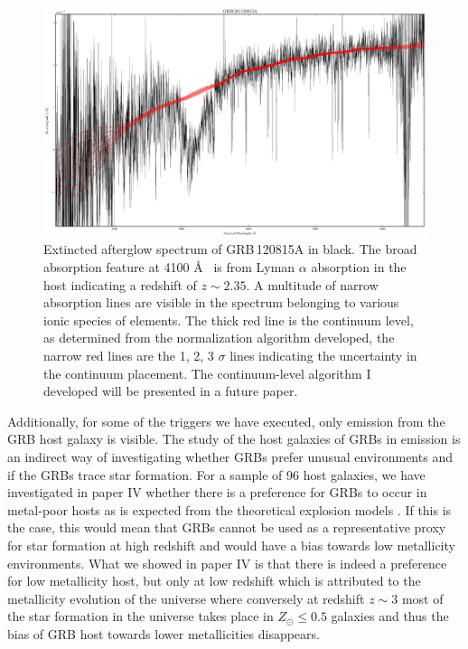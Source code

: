 \begin{figure}[htb]
	
	\includegraphics[width=\textwidth]{gfx/normspec}
	
	\caption{Extincted afterglow spectrum of GRB\,120815A in black. The broad
absorption feature at 4100 \AA~ is from Lyman $\alpha$ absorption in the host
indicating a redshift of $z \sim 2.35$. A multitude of narrow absorption lines
are visible in the spectrum belonging to various ionic species of elements. The
thick red line is the continuum level, as determined from the normalization
algorithm developed, the narrow red lines are the 1, 2, 3 $\sigma$ lines
indicating the uncertainty in the continuum placement. The continuum-level
algorithm I developed will be presented in a future paper.}
	\label{fig:intro:grbext}
\end{figure}

Additionally, for some of the triggers we have executed, only emission from
the
GRB host galaxy is visible. The study of the host galaxies of GRBs in emission
is an
indirect way of investigating whether GRBs prefer unusual environments and
if
the GRBs trace star formation. For a sample of 96 host galaxies, we have
investigated in paper IV \citep{Kruhler2015} whether there is a preference for
GRBs to occur in metal-poor hosts as is expected from the theoretical explosion
models \citep{Woosley1993}. If this is the case, this would mean that GRBs
cannot be used as a
representative proxy for star formation at high redshift and
would have a bias
towards low metallicity environments. What we showed in paper
IV is that there
is indeed a preference for low metallicity host, but only at
low redshift which
is attributed to the metallicity evolution of the universe
where conversely at
redshift $z \sim 3$ most of the star formation in the
universe takes place in
$Z_\odot \leq 0.5$ galaxies and thus the bias of GRB
host towards lower
metallicities disappears.


